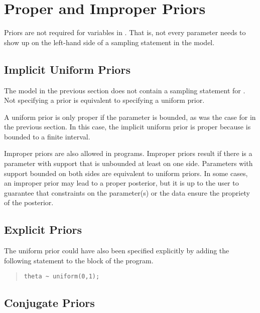 \section{Proper and Improper Priors}

Priors are not required for variables in \Stan.  That is, not every
parameter needs to show up on the left-hand side of a sampling
statement in the model.  

\subsection{Implicit Uniform Priors}

The model in the previous section does not contain a sampling
statement for .  Not specifying a prior is equivalent to
specifying a uniform prior.  

A uniform prior is only proper if the parameter is bounded, as was the
case for  in the previous section.  In this case, the
implicit uniform prior is proper because  is bounded to a
finite interval.

Improper priors are also allowed in \Stan programs.  Improper priors
result if there is a parameter with support that is unbounded at least
on one side.  Parameters with support bounded on both sides are
equivalent to uniform priors.  In some cases, an improper prior may
lead to a proper posterior, but it is up to the user to guarantee that
constraints on the parameter(s) or the data ensure the propriety of
the posterior.

\subsection{Explicit Priors}

The uniform prior could have also been specified explicitly by adding the
following statement to the  block of the program.
%
\begin{quote}
\begin{Verbatim} 
theta ~ uniform(0,1);
\end{Verbatim}
\end{quote}
% 

\subsection{Conjugate Priors}

